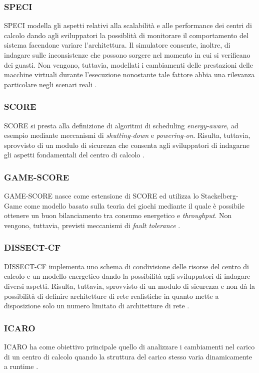 {\subsubsection*{SPECI}
SPECI \cite{sriram2009speci} modella gli aspetti relativi alla scalabilità e alle performance dei centri di calcolo dando agli sviluppatori la possiblità di monitorare il comportamento del sistema facendone variare l'architettura. Il simulatore consente, inoltre, di indagare sulle inconsistenze che possono sorgere nel momento in cui si verificano dei guasti. Non vengono, tuttavia, modellati i cambiamenti delle prestazioni delle macchine virtuali durante l'esecuzione nonostante tale fattore abbia una rilevanza particolare negli scenari reali \cite{mansouri2020cloud}.  
\subsubsection*{SCORE}
SCORE \cite{fernandez2018score} si presta alla definizione di algoritmi di scheduling \emph{energy-aware}, ad esempio mediante meccanismi di \emph{shutting-down} e \emph{powering-on}. Risulta, tuttavia, sprovvisto di un modulo di sicurezza che consenta agli sviluppatori di indagarne gli aspetti fondamentali del centro di calcolo \cite{mansouri2020cloud}. 
\subsubsection*{GAME-SCORE}
GAME-SCORE \cite{fernandez2019game} nasce come estensione di SCORE ed utilizza lo Stackelberg-Game \cite{fernandez2018stackelberg} come modello basato sulla teoria dei giochi mediante il quale è possibile ottenere un buon bilanciamento tra consumo energetico e \emph{throughput}. Non vengono, tuttavia, previsti meccanismi di \emph{fault tolerance} \cite{mansouri2020cloud}. 
\subsubsection*{DISSECT-CF}
DISSECT-CF \cite{kecskemeti2015dissect} implementa uno schema di condivisione delle risorse del centro di calcolo e un modello energetico dando la possibilità agli sviluppatori di indagare diversi aspetti. Risulta, tuttavia, sprovvisto di un modulo di sicurezza e non dà la possibilità di definire architetture di rete realistiche in quanto mette a disposizione solo un numero limitato di architetture di rete \cite{mansouri2020cloud}.
\subsubsection{ICARO}
ICARO \cite{badii2016icaro} ha come obiettivo principale quello di analizzare i cambiamenti nel carico di un centro di calcolo quando la struttura del carico stesso varia dinamicamente a runtime \cite{khalil2017cloud}. 
}
